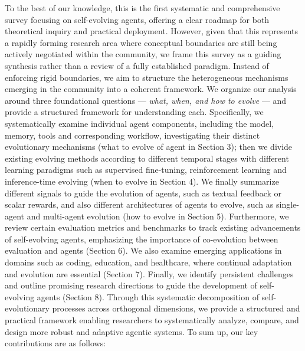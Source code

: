 To the best of our knowledge, this is the first systematic and comprehensive survey focusing on self-evolving agents, offering a clear roadmap for both theoretical inquiry and practical deployment. However, given that this represents a rapidly forming research area where conceptual boundaries are still being actively negotiated within the community, we frame this survey as a guiding synthesis rather than a review of a fully established paradigm. Instead of enforcing rigid boundaries, we aim to structure the heterogeneous mechanisms emerging in the community into a coherent framework.
We organize our analysis around three foundational questions --- \textit{what, when, and how to evolve} --- and provide a structured framework for understanding each. Specifically, we systematically examine individual agent components, including the model, memory, tools and corresponding workflow, investigating their distinct evolutionary mechanisms (what to evolve of agent in Section 3); then we divide existing evolving methods according to different temporal stages with different learning paradigms such as supervised fine-tuning, reinforcement learning and inference-time evolving (when to evolve in Section 4). We finally summarize different signals to guide the evolution of agents, such as textual feedback or scalar rewards, and also different architectures of agents to evolve, such as single-agent and multi-agent evolution 
(how to evolve in Section 5). Furthermore, we review certain evaluation metrics and benchmarks to track existing advancements of self-evolving agents, emphasizing the importance of co-evolution between evaluation and agents (Section 6). We also examine emerging applications in domains such as coding, education, and healthcare, where continual adaptation and evolution are essential (Section 7). Finally, we identify persistent challenges and outline promising research directions to guide the development of self-evolving agents (Section 8). Through this systematic decomposition of self-evolutionary processes across orthogonal dimensions, we provide a structured and practical framework enabling researchers to systematically analyze, compare, and design more robust and adaptive agentic systems. To sum up, our key contributions are as follows:


